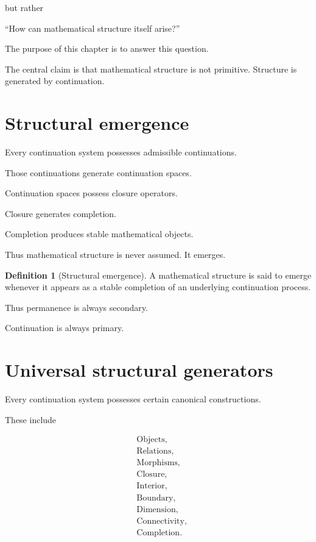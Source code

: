 \documentclass[13pt,openany]{book}
\theoremstyle{plain}
\theoremstyle{definition}
\newtheorem{definition}{Definition}[chapter]
\begin{document}
but rather

\begin{center}
``How can mathematical structure itself arise?''
\end{center}

The purpose of this chapter is to answer this question.

The central claim is that mathematical structure is not primitive.
Structure is generated by continuation.


\section{Structural emergence}

Every continuation system possesses admissible continuations.

Those continuations generate continuation spaces.

Continuation spaces possess closure operators.

Closure generates completion.

Completion produces stable mathematical objects.

Thus mathematical structure is never assumed.
It emerges.

\begin{definition}[Structural emergence]
A mathematical structure is said to emerge whenever it appears as a stable
completion of an underlying continuation process.
\end{definition}

Thus permanence is always secondary.

Continuation is always primary.


\section{Universal structural generators}

Every continuation system possesses certain canonical constructions.

These include

\[
\begin{aligned}
&\text{Objects},\\
&\text{Relations},\\
&\text{Morphisms},\\
&\text{Closure},\\
&\text{Interior},\\
&\text{Boundary},\\
&\text{Dimension},\\
&\text{Connectivity},\\
&\text{Completion}.
\end{aligned}
\]
\end{document}
